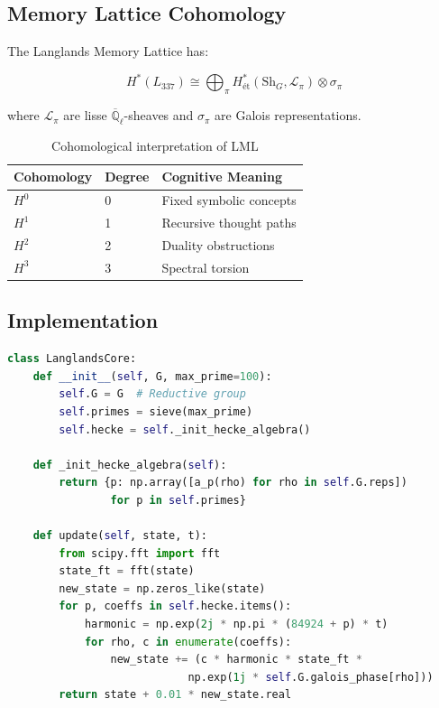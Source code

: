 \documentclass[12pt]{article}
\begin{document}
\subsection{Memory Lattice Cohomology}
The Langlands Memory Lattice has:

\[
H^*(L_{337}) \cong \bigoplus_{\pi} H^*_{\text{\'et}}(\text{Sh}_G, \mathcal{L}_\pi) \otimes \sigma_\pi
\]

where $\mathcal{L}_\pi$ are lisse $\overline{\mathbb{Q}}_\ell$-sheaves and $\sigma_\pi$ are Galois representations.

\begin{table}[h]
\centering
\begin{tabular}{lll}
\toprule
\textbf{Cohomology} & \textbf{Degree} & \textbf{Cognitive Meaning} \\
\midrule
$H^0$ & 0 & Fixed symbolic concepts \\
$H^1$ & 1 & Recursive thought paths \\
$H^2$ & 2 & Duality obstructions \\
$H^3$ & 3 & Spectral torsion \\
\bottomrule
\end{tabular}
\caption{Cohomological interpretation of LML}
\end{table}

\subsection{Implementation}
\begin{lstlisting}[language=Python,caption={Recursive Langlands Operator}]
class LanglandsCore:
    def __init__(self, G, max_prime=100):
        self.G = G  # Reductive group
        self.primes = sieve(max_prime)
        self.hecke = self._init_hecke_algebra()
        
    def _init_hecke_algebra(self):
        return {p: np.array([a_p(rho) for rho in self.G.reps]) 
                for p in self.primes}
    
    def update(self, state, t):
        from scipy.fft import fft
        state_ft = fft(state)
        new_state = np.zeros_like(state)
        for p, coeffs in self.hecke.items():
            harmonic = np.exp(2j * np.pi * (84924 + p) * t)
            for rho, c in enumerate(coeffs):
                new_state += (c * harmonic * state_ft * 
                            np.exp(1j * self.G.galois_phase[rho]))
        return state + 0.01 * new_state.real
\end{lstlisting}
\end{document}
